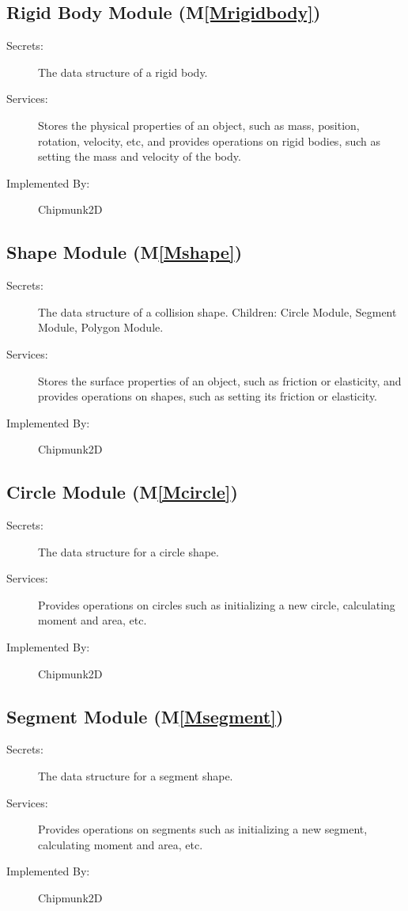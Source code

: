 \documentclass[12pt]{article}
\begin{document}
\subsection{Rigid Body Module (M\ref{Mrigidbody})}
\label{Sec:RBM()}
\begin{description}
\item[Secrets:]The data structure of a rigid body.
\item[Services:]Stores the physical properties of an object, such as mass, position, rotation, velocity, etc, and provides operations on rigid bodies, such as setting the mass and velocity of the body.
\item[Implemented By:]Chipmunk2D
\end{description}
\subsection{Shape Module (M\ref{Mshape})}
\label{Sec:SM()}
\begin{description}
\item[Secrets:]The data structure of a collision shape. Children: Circle Module, Segment Module, Polygon Module.
\item[Services:]Stores the surface properties of an object, such as friction or elasticity, and provides operations on shapes, such as setting its friction or elasticity.
\item[Implemented By:]Chipmunk2D
\end{description}
\subsection{Circle Module (M\ref{Mcircle})}
\label{Sec:CM()}
\begin{description}
\item[Secrets:]The data structure for a circle shape.
\item[Services:]Provides operations on circles such as initializing a new circle, calculating moment and area, etc.
\item[Implemented By:]Chipmunk2D
\end{description}
\subsection{Segment Module (M\ref{Msegment})}
\label{Sec:SM()}
\begin{description}
\item[Secrets:]The data structure for a segment shape.
\item[Services:]Provides operations on segments such as initializing a new segment, calculating moment and area, etc.
\item[Implemented By:]Chipmunk2D
\end{description}
\end{document}

